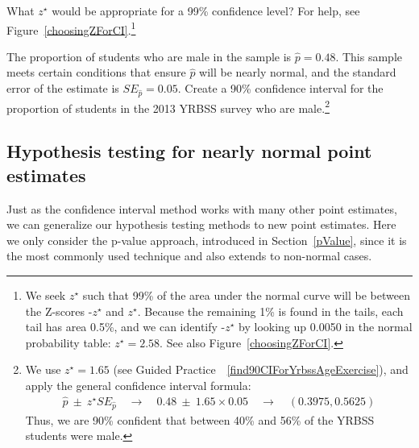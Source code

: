 \begin{exercise} \label{findZFor99PercConfLevelInFrameworkForInf}
What $z^{\star}$ would be appropriate for a 99\% confidence level? For help, see Figure~\vref{choosingZForCI}.\footnote{We seek $z^{\star}$ such that 99\% of the area under the normal curve will be between the Z-scores -$z^{\star}$ and $z^{\star}$. Because the remaining 1\% is found in the tails, each tail has area 0.5\%, and we can identify -$z^{\star}$ by looking up 0.0050 in the normal probability table: $z^{\star} = 2.58$. See also Figure~\vref{choosingZForCI}.}
\end{exercise}

\textC{\newpage}

\begin{exercise}
The proportion of students who are male in the  sample is $\hat{p} = 0.48$. This sample meets certain conditions that ensure $\hat{p}$ will be nearly normal, and the standard error of the estimate is $SE_{\hat{p}} = 0.05$. Create a 90\% confidence interval for the proportion of students in the 2013 YRBSS survey who are male.\footnote{We use $z^{\star}=1.65$ (see Guided Practice~~\vref{find90CIForYrbssAgeExercise}), and apply the general confidence interval formula:
\begin{eqnarray*}
\hat{p}\ \pm\ z^{\star}SE_{\hat{p}}
	\quad\to\quad 0.48\ \pm\ 1.65\times 0.05
	\quad\to\quad (0.3975, 0.5625)
\end{eqnarray*}
Thus, we are 90\% confident that between 40\% and 56\% of the YRBSS students were male.}
\end{exercise}


\subsection{Hypothesis testing for nearly normal point estimates}

Just as the confidence interval method works with many other point estimates, we can generalize our hypothesis testing methods to new point estimates. Here we only consider the p-value approach, introduced in Section~\ref{pValue}, since it is the most commonly used technique and also extends to non-normal cases.

